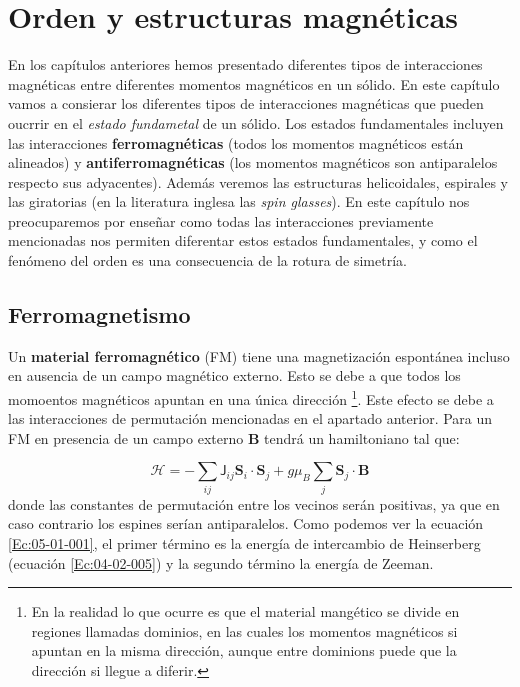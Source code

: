 \documentclass[12pt,a4paper]{book}
\numberwithin{equation}{section}
\numberwithin{figure}{section}
\newcommand{\Hcal}{\mathcal{H}}
\newcommand{\Jsf}{\mathsf{J}}
\newcommand{\Bn}{\mathbf{B}}
\newcommand{\Sn}{\mathbf{S}}
\begin{document}
\newpage

\chapter{Orden y estructuras magnéticas}

En los capítulos anteriores hemos presentado diferentes tipos de interacciones magnéticas entre diferentes momentos magnéticos en un sólido. En este capítulo vamos a consierar los diferentes tipos de interacciones magnéticas que pueden oucrrir en el \textit{estado fundametal} de un sólido. Los estados fundamentales incluyen las interacciones \textbf{ferromagnéticas} (todos los momentos magnéticos están alineados) y \textbf{antiferromagnéticas} (los momentos magnéticos son antiparalelos respecto sus adyacentes). Además veremos las estructuras helicoidales, espirales y las giratorias (en la literatura inglesa las \textit{spin glasses}). En este capítulo nos preocuparemos por enseñar como todas las interacciones previamente mencionadas nos permiten diferentar estos estados fundamentales, y como el fenómeno del orden es una consecuencia de la rotura de simetría. 

\section{Ferromagnetismo}

Un \textbf{material ferromagnético} (FM) tiene una magnetización espontánea incluso en ausencia de un campo magnético externo. Esto se debe a que todos los momoentos magnéticos apuntan en una única dirección \footnote{En la realidad lo que ocurre es que el material mangético se divide en regiones llamadas dominios, en las cuales los momentos magnéticos si apuntan en la misma dirección, aunque entre dominions puede que la dirección si llegue a diferir.}. Este efecto se debe a las interacciones de permutación mencionadas en el apartado anterior. Para un FM en presencia de un campo externo $\Bn$ tendrá un hamiltoniano tal que:

\begin{equation}
    \Hcal = - \sum_{ij} \Jsf_{ij} \Sn_i \cdot \Sn_j + g \mu_B \sum_j \Sn_j \cdot \Bn \label{Ec:05-01-001}
\end{equation}
donde las constantes de permutación entre los vecinos serán positivas, ya que en caso contrario los espines serían antiparalelos. Como podemos ver la ecuación \ref{Ec:05-01-001}, el primer término es la energía de intercambio de Heinserberg (ecuación \ref{Ec:04-02-005}) y la segundo término la energía de Zeeman. 
\end{document}
